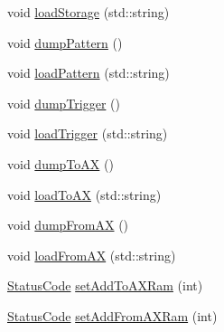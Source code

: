 \begin{DoxyCompactItemize}
void \hyperlink{classA3PE_a8bd4a7a5dd8219f93386756c24a0f0b5}{load\+Storage} (std\+::string)
\item 
void \hyperlink{classA3PE_a23da04d3c7e632dfb64e5ed4e21a21f3}{dump\+Pattern} ()
\item 
void \hyperlink{classA3PE_a522cba0a4d976eec59222504af188fb2}{load\+Pattern} (std\+::string)
\item 
void \hyperlink{classA3PE_aeab7701d0d1f6fd910e952b631769d42}{dump\+Trigger} ()
\item 
void \hyperlink{classA3PE_a34a9499a0d9065a1b5772880d7e8d5c4}{load\+Trigger} (std\+::string)
\item 
void \hyperlink{classA3PE_ad6b6f1ae4ac23e6d0827eee8cc2c98e4}{dump\+To\+AX} ()
\item 
void \hyperlink{classA3PE_a40017b4138705690f8b04e336a7ffcdf}{load\+To\+AX} (std\+::string)
\item 
void \hyperlink{classA3PE_a60a510251ec2b5fd800af2ba88e9fdac}{dump\+From\+AX} ()
\item 
void \hyperlink{classA3PE_a65235f7d42e8f7fb6056f5629545d2aa}{load\+From\+AX} (std\+::string)
\item 
\hyperlink{classStatusCode}{Status\+Code} \hyperlink{classA3PE_a54fe4da570ea8833fe2c981de1085387}{set\+Add\+To\+A\+X\+Ram} (int)
\item 
\hyperlink{classStatusCode}{Status\+Code} \hyperlink{classA3PE_a834fde5951d2c1bf6b41842520360fce}{set\+Add\+From\+A\+X\+Ram} (int)
\end{DoxyCompactItemize}
